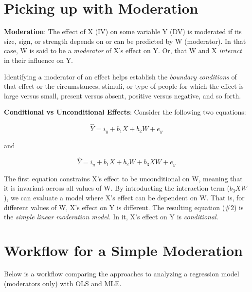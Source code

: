 \documentclass[
]{book}
\begin{document}
\hypertarget{picking-up-with-moderation}{%
\section{Picking up with Moderation}\label{picking-up-with-moderation}}

\textbf{Moderation}: The effect of X (IV) on some variable Y (DV) is moderated if its size, sign, or strength depends on or can be predicted by W (moderator). In that case, W is said to be a \emph{moderator} of X's effect on Y. Or, that W and X \emph{interact} in their influence on Y.

Identifying a moderator of an effect helps establish the \emph{boundary conditions} of that effect or the circumstances, stimuli, or type of people for which the effect is large versus small, present versus absent, positive versus negative, and so forth.

\textbf{Conditional vs Unconditional Effects}: Consider the following two equations:

\[\hat{Y} = i_{y}+b_{1}X + b_{2}W + e_{y}\]

and

\[\hat{Y} = i_{y}+b_{1}X + b_{2}W + b_{3}XW+ e_{y}\]

The first equation constrains X's effect to be unconditional on W, meaning that it is invariant across all values of W. By introducting the interaction term (\(b_{3}XW\)), we can evaluate a model where X's effect can be dependent on W. That is, for different values of W, X's effect on Y is different. The resulting equation (\#2) is the \emph{simple linear moderation model.} In it, X's effect on Y is \emph{conditional}.

\hypertarget{workflow-for-a-simple-moderation}{%
\section{Workflow for a Simple Moderation}\label{workflow-for-a-simple-moderation}}

Below is a workflow comparing the approaches to analyzing a regression model (moderators only) with OLS and MLE.
\end{document}
